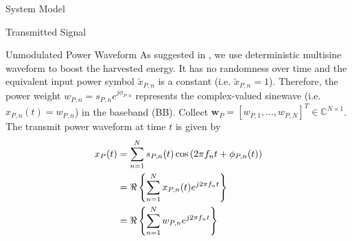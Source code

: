 \documentclass{IEEEtran}
\begin{document}
\begin{section} {System Model}
\begin{subsection}	{Transmitted Signal}
		\begin{subsubsection} {Unmodulated Power Waveform}
			As suggested in \cite{Clerckx2018b,Clerckx2016a}, we use deterministic multisine waveform to boost the harvested energy. It has no randomness over time and the equivalent input power symbol $\tilde{x}_{P,n}$ is a constant (i.e. $\tilde{x}_{P,n} = 1$). Therefore, the power weight $w_{P,n} = s_{P,n} e^{j\phi_{P,n}}$ represents the complex-valued sinewave (i.e. $x_{P,n}(t) = w_{P,n}$) in the baseband (BB). Collect $\boldsymbol{w}_P=[w_{P,1},\dots,w_{P,N}]^T \in \mathbb{C}^{N \times 1}$. The transmit power waveform at time $t$ is given by
			\begin{equation}	\label{eq:x{P}(t)}
				\begin{split}
					x_{P}(t)
					&= \sum_{n=1}^{N} s_{P,n}(t) \cos \left( 2 \pi f_n t + \phi_{P,n}(t) \right)	\\
					&= \Re \left\{ \sum_{n=1}^{N} x_{P,n}(t) e^{j2 \pi f_n t} \right\}	\\
					&= \Re \left\{ \sum_{n=1}^{N} w_{P,n} e^{j2 \pi f_n t} \right\}
				\end{split}
			\end{equation}
		\end{subsubsection}


\end{subsection}
\end{section}
\end{document}
